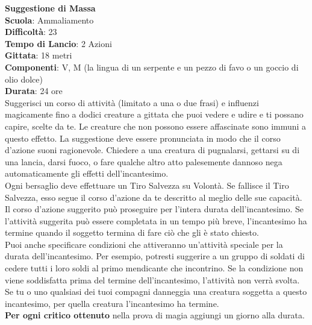 \begin{multicols}{2}
\medskip\textbf{Suggestione di Massa}\\
\textbf{Scuola}: Ammaliamento\\
\textbf{Difficoltà}: 23\\
\textbf{Tempo di Lancio}: 2 Azioni\\
\textbf{Gittata}: 18 metri\\
\textbf{Componenti}: V, M (la lingua di un serpente e un pezzo di favo o un goccio di olio dolce)\\
\textbf{Durata}: 24 ore\\
Suggerisci un corso di attività (limitato a una o due frasi) e influenzi magicamente fino a dodici creature a gittata che puoi vedere e udire e ti possano capire, scelte da te. Le creature che non possono essere affascinate sono immuni a questo effetto. La suggestione deve essere pronunciata in modo che il corso d'azione suoni ragionevole. Chiedere a una creatura di pugnalarsi, gettarsi su di una lancia, darsi fuoco, o fare qualche altro atto palesemente dannoso nega automaticamente gli effetti dell'incantesimo.\\
Ogni bersaglio deve effettuare un Tiro Salvezza su Volontà. Se fallisce il Tiro Salvezza, esso segue il corso d'azione da te descritto al meglio delle sue capacità. Il corso d'azione suggerito può proseguire per l'intera durata dell'incantesimo. Se l'attività suggerita può essere completata in un tempo più breve, l'incantesimo ha termine quando il soggetto termina di fare ciò che gli è stato chiesto.\\
Puoi anche specificare condizioni che attiveranno un'attività speciale per la durata dell'incantesimo. Per esempio, potresti suggerire a un gruppo di soldati di cedere tutti i loro soldi al primo mendicante che incontrino. Se la condizione non viene soddisfatta prima del termine dell'incantesimo, l'attività non verrà svolta. Se tu o uno qualsiasi dei tuoi compagni danneggia una creatura soggetta a questo incantesimo, per quella creatura l'incantesimo ha termine.\\
\textbf{Per ogni critico ottenuto} nella prova di magia aggiungi un giorno alla durata.


\end{multicols}
